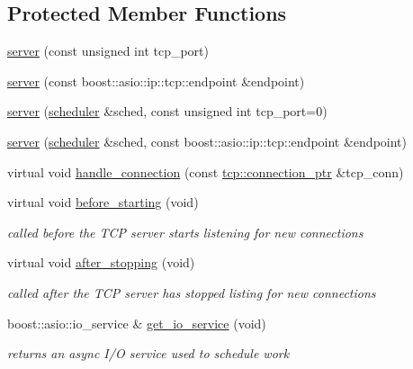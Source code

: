 \subsection*{Protected Member Functions}
\begin{DoxyCompactItemize}
\item 
\hyperlink{classpion_1_1tcp_1_1server_a2129bce03fd902c051e2a4b96d6bdf49}{server} (const unsigned int tcp\-\_\-port)
\item 
\hyperlink{classpion_1_1tcp_1_1server_a0e08d42a00d597952109e6a739942e94}{server} (const boost\-::asio\-::ip\-::tcp\-::endpoint \&endpoint)
\item 
\hyperlink{classpion_1_1tcp_1_1server_a1ddc1887495e6bf0b236cd424929a1eb}{server} (\hyperlink{classpion_1_1scheduler}{scheduler} \&sched, const unsigned int tcp\-\_\-port=0)
\item 
\hyperlink{classpion_1_1tcp_1_1server_a1c66625024db0e229eab6d825d8fee2e}{server} (\hyperlink{classpion_1_1scheduler}{scheduler} \&sched, const boost\-::asio\-::ip\-::tcp\-::endpoint \&endpoint)
\item 
virtual void \hyperlink{classpion_1_1tcp_1_1server_a1e8ae789868cd0b8eb08e5c3da9b33a4}{handle\-\_\-connection} (const \hyperlink{namespacepion_1_1tcp_a6c9b7497068009f6d81d95ec0b0627d6}{tcp\-::connection\-\_\-ptr} \&tcp\-\_\-conn)
\item 
virtual void \hyperlink{classpion_1_1tcp_1_1server_a814a44fc3d677071b9e2407898765316}{before\-\_\-starting} (void)
\begin{DoxyCompactList}\small\item\em called before the T\-C\-P server starts listening for new connections \end{DoxyCompactList}\item 
virtual void \hyperlink{classpion_1_1tcp_1_1server_a23766baf23b7b5be2e43da55547c3a31}{after\-\_\-stopping} (void)
\begin{DoxyCompactList}\small\item\em called after the T\-C\-P server has stopped listing for new connections \end{DoxyCompactList}\item 
boost\-::asio\-::io\-\_\-service \& \hyperlink{classpion_1_1tcp_1_1server_a436e6dbcc3b128b2f9a9be6fd99421b6}{get\-\_\-io\-\_\-service} (void)
\begin{DoxyCompactList}\small\item\em returns an async I/\-O service used to schedule work \end{DoxyCompactList}\end{DoxyCompactItemize}
